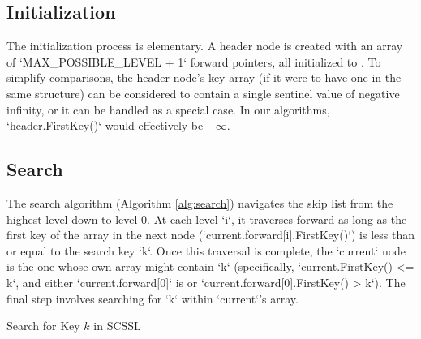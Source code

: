 \documentclass[sigconf]{acmart}
\begin{document}
\subsection{Initialization}
The initialization process is elementary. A header node is created with an array of `MAX_POSSIBLE_LEVEL + 1` forward pointers, all initialized to \Nil. To simplify comparisons, the header node's key array (if it were to have one in the same structure) can be considered to contain a single sentinel value of negative infinity, or it can be handled as a special case. In our algorithms, `header.FirstKey()` would effectively be $-\infty$.

\subsection{Search}
The search algorithm (Algorithm \ref{alg:search}) navigates the skip list from the highest level down to level 0. At each level `i`, it traverses forward as long as the first key of the array in the next node (`current.forward[i].FirstKey()`) is less than or equal to the search key `k`. Once this traversal is complete, the `current` node is the one whose own array might contain `k` (specifically, `current.FirstKey() <= k`, and either `current.forward[0]` is \Nil or `current.forward[0].FirstKey() > k`). The final step involves searching for `k` within `current`'s array.

\begin{algorithm}[htbp] %
    \caption{Search for Key $k$ in SCSSL}
    \label{alg:search}
\end{algorithm}
\end{document}
